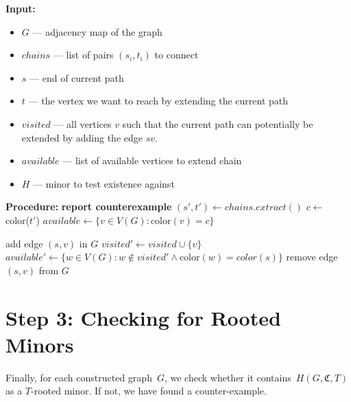 \begin{algorithm}[H]
    \caption{$(G, \mathit{chains}, s, t, \mathit{visited}, \mathit{available}, H)$}
    \begin{algorithmic}[1]
        \Statex \textbf{Input:}
        \begin{itemize}
            \item $G$ — adjacency map of the graph
            \item $\mathit{chains}$ — list of pairs $(s_i,t_i)$ to connect
            \item $s$ — end of current path
            \item $t$ — the vertex we want to reach by extending the current path
            \item $\mathit{visited}$ — all vertices $v$ such that the current path can potentially be extended by adding the edge $sv$.
            \item $\mathit{available}$ — list of available vertices to extend chain
            \item $H$ — minor to test existence against
        \end{itemize}
        \Statex \textbf{Procedure:}
                    \Return
                \Else
                    \State \textbf{report counterexample}
                \EndIf
            \Else {}
                \State $(s',t') \gets \mathit{chains.extract()}$
                \State $c \gets$ color($t'$)
                \State $\mathit{available} \gets \{v \in V(G): \text{color}(v)=c\}$
                \State {}
            \EndIf
            \State \Return
        \EndIf

            \State add edge $(s,v)$ in $G$ 
            \State $\mathit{visited}' \gets \mathit{visited} \cup \{v\}$
            \State $\mathit{available}' \gets \{ w \in V(G): w \notin \mathit{visited}' \wedge \text{color}(w)=color(s)\}$
            \State {}
            \State remove edge $(s,v)$ from $G$
        \EndFor
    \end{algorithmic}
\end{algorithm}

\section{Step 3: Checking for Rooted Minors}\label{sec:check-minor}
Finally, for each constructed graph~$G$, we check whether it contains~$H(G, \mathfrak{C}, T)$ as a $T$-rooted minor. If not, we have found a counter-example.

